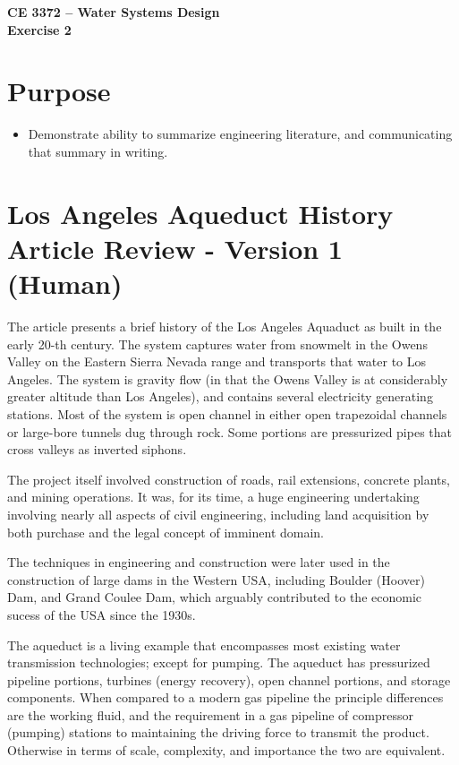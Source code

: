 \documentclass[12pt]{article}
\begin{document}
\begin{center}
{\textbf{{ CE 3372 -- Water Systems Design} \\ {Exercise 2}}}
\end{center}
\section*{\small{Purpose}}
\begin{itemize}
\item Demonstrate ability to summarize engineering literature, and communicating that summary in writing.
\end{itemize}
\section*{\small{Los Angeles Aqueduct History Article Review - Version 1 (Human)}}

The article presents a brief history of the Los Angeles Aquaduct as built in the early 20-th century. The system captures water from snowmelt in the Owens Valley on the Eastern Sierra Nevada range and transports that water to Los Angeles. The system is gravity flow (in that the Owens Valley is at considerably greater altitude than Los Angeles), and contains several electricity generating stations. Most of the system is open channel in either open trapezoidal channels or large-bore tunnels dug through rock. Some portions are pressurized pipes that cross valleys as inverted siphons.

The project itself involved construction of roads, rail extensions, concrete plants, and mining operations. It was, for its time, a huge engineering undertaking involving nearly all aspects of civil engineering, including land acquisition by both purchase and the legal concept of imminent domain.

The techniques in engineering and construction were later used in the construction of large dams in the Western USA, including Boulder (Hoover) Dam, and Grand Coulee Dam, which arguably contributed to the economic sucess of the USA since the 1930s.

The aqueduct is a living example that encompasses most existing water transmission technologies; except for pumping. The aqueduct has pressurized pipeline portions, turbines (energy recovery), open channel portions, and storage components. When compared to a modern gas pipeline the principle differences are the working fluid, and the requirement in a gas pipeline of compressor (pumping) stations to maintaining the driving force to transmit the product. Otherwise in terms of scale, complexity, and importance the two are equivalent.
\clearpage
\end{document}

